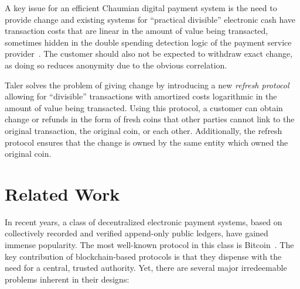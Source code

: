 \documentclass{llncs}
\begin{document}
A key issue for an efficient Chaumian digital payment system is the
need to provide change and existing systems for ``practical
divisible'' electronic cash have transaction costs that are linear in
the amount of value being transacted, sometimes hidden in the double
spending detection logic of the payment service
provider~\cite{martens2015practical}.  The customer should also not be
expected to withdraw exact change, as doing so reduces anonymity due
to the obvious correlation.

Taler solves the problem of giving change by introducing a new {\em
  refresh protocol} allowing for ``divisible'' transactions with
amortized costs logarithmic in the amount of value being transacted.
Using this protocol, a customer can obtain change or refunds in the
form of fresh coins that other parties cannot link to the original
transaction, the original coin, or each other.  Additionally, the
refresh protocol ensures that the change is owned by the same entity
which owned the original coin.


\section{Related Work}


In recent years, a class of decentralized electronic payment systems,
based on collectively recorded and verified append-only public
ledgers, have gained immense popularity.  The most well-known protocol
in this class is Bitcoin~\cite{nakamoto2008bitcoin}.  The key
contribution of blockchain-based protocols is that they dispense with
the need for a central, trusted authority.  Yet, there are several
major irredeemable problems inherent in their designs:
\end{document}
